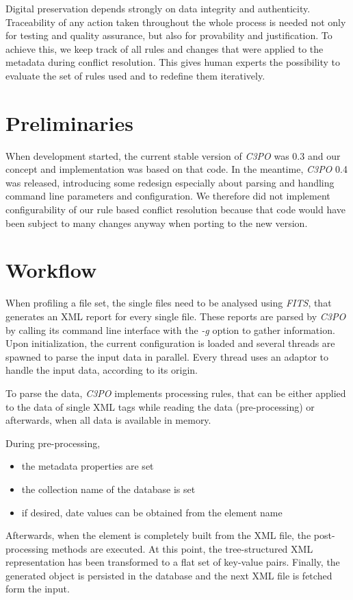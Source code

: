 \documentclass[a4paper,12pt]{article}
\begin{document}
Digital preservation depends strongly on data integrity and authenticity. Traceability of any action taken throughout the whole process is needed not only for testing and quality assurance, but also for provability and justification. To achieve this, we keep track of all rules and changes that were applied to the metadata during conflict resolution. This gives human experts the possibility to evaluate the set of rules used and to redefine them iteratively.

\section{Preliminaries}
When development started, the current stable version of \emph{C3PO} was 0.3 and our concept and implementation was based on that code. In the meantime, \emph{C3PO} 0.4 was released, introducing some redesign especially about parsing and handling command line parameters and configuration. We therefore did not implement configurability of our rule based conflict resolution because that code would have been subject to many changes anyway when porting to the new version.

\section{Workflow}
When profiling a file set, the single files need to be analysed using \emph{FITS}, that generates an XML report for every single file. These reports are parsed by \emph{C3PO} by calling its command line interface with the \emph{-g} option to gather information. Upon initialization, the current configuration is loaded and several threads are spawned to parse the input data in parallel. Every thread uses an adaptor to handle the input data, according to its origin.

To parse the data, \emph{C3PO} implements processing rules, that can be either applied to the data of single XML tags while reading the data (pre-processing) or afterwards, when all data is available in memory.

During pre-processing, 
\begin{itemize}
\item the metadata properties are set
\item the collection name of the database is set
\item if desired, date values can be obtained from the element name
\end{itemize}
Afterwards, when the element is completely built from the XML file, the post-processing methods are executed. At this point, the tree-structured XML representation has been transformed to a flat set of key-value pairs. Finally, the generated object is persisted in the database and the next XML file is fetched form the input.
\end{document}
